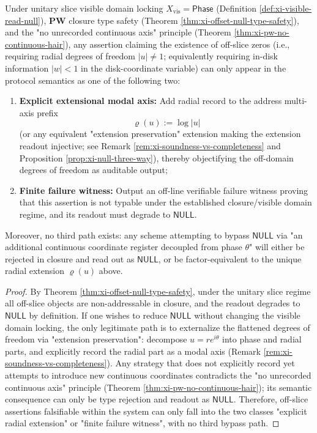 
\begin{corollary}\label{cor:xi-fourth-register-dichotomy}
Under unitary slice visible domain locking \(X_{\mathrm{vis}}=\mathsf{Phase}\) (Definition \ref{def:xi-visible-read-null}), \(\mathbf{PW}\) closure type safety (Theorem \ref{thm:xi-offset-null-type-safety}), and the "no unrecorded continuous axis" principle (Theorem \ref{thm:xi-pw-no-continuous-hair}), any assertion claiming the existence of off-slice zeros (i.e., requiring radial degrees of freedom \(|u|\neq 1\); equivalently requiring in-disk information \(|w|<1\) in the disk-coordinate variable) can only appear in the protocol semantics as one of the following two:
\begin{enumerate}
  \item \textbf{Explicit extensional modal axis:} Add radial record to the address multi-axis prefix
  \[
  \varrho(u):=\log|u|
  \]
  (or any equivalent "extension preservation" extension making the extension readout injective; see Remark \ref{rem:xi-soundness-vs-completeness} and Proposition \ref{prop:xi-null-three-way}), thereby objectifying the off-domain degrees of freedom as auditable output;
  \item \textbf{Finite failure witness:} Output an off-line verifiable failure witness proving that this assertion is not typable under the established closure/visible domain regime, and its readout must degrade to \(\mathsf{NULL}\).
\end{enumerate}
Moreover, no third path exists: any scheme attempting to bypass \(\mathsf{NULL}\) via "an additional continuous coordinate register decoupled from phase \(\theta\)" will either be rejected in closure and read out as \(\mathsf{NULL}\), or be factor-equivalent to the unique radial extension \(\varrho(u)\) above.
\end{corollary}
\begin{proof}
By Theorem \ref{thm:xi-offset-null-type-safety}, under the unitary slice regime all off-slice objects are non-addressable in closure, and the readout degrades to \(\mathsf{NULL}\) by definition.
If one wishes to reduce \(\mathsf{NULL}\) without changing the visible domain locking, the only legitimate path is to externalize the flattened degrees of freedom via "extension preservation": decompose \(u=re^{i\theta}\) into phase and radial parts, and explicitly record the radial part as a modal axis (Remark \ref{rem:xi-soundness-vs-completeness}).
Any strategy that does not explicitly record yet attempts to introduce new continuous coordinates contradicts the "no unrecorded continuous axis" principle (Theorem \ref{thm:xi-pw-no-continuous-hair}); its semantic consequence can only be type rejection and readout as \(\mathsf{NULL}\).
Therefore, off-slice assertions falsifiable within the system can only fall into the two classes "explicit radial extension" or "finite failure witness", with no third bypass path.
\end{proof}

